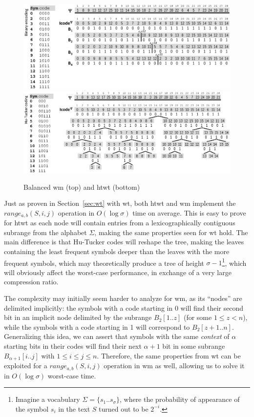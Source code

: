 \documentclass[a4paper,10pt,twoside]{book}
\begin{document}
	\begin{figure}[htb]
    	\begin{center}
    		{\includegraphics[width=1.0\textwidth]{figures/wma.eps}}
    		{\includegraphics[width=1.0\textwidth]{figures/wta.eps}}
    	\end{center}
    	\caption{Balanced \acrlong{wm} (top) and \acrlong{htwt} (bottom)}
    	\label{fig:wtwm}
    \end{figure}

	
	Just as proven in Section~\ref{sec:wt} with \gls{wt}, both \gls{htwt} and \gls{wm} implement the $range_{a,b}(S,i,j)$ operation in $O(\log\sigma)$ time on average. This is easy to prove for \gls{htwt} as each node will contain entries from a lexicographically contiguous subrange from the alphabet $\Sigma$, making the same properties seen for \gls{wt} hold. The main difference is that Hu-Tucker codes will reshape the tree, making the leaves containing the least frequent symbols deeper than the leaves with the more frequent symbols, which may theoretically produce a tree of height $\sigma-1$\footnote{Imagine a vocabulary $\Sigma=\{s_1..s_\sigma\}$, where the probability of appearance of the symbol $s_i$ in the text $S$ turned out to be $2^{-i}$.}, which will obviously affect the worst-case performance, in exchange of a very large compression ratio.
	
	The complexity may initially seem harder to analyze for \gls{wm}, as its ``nodes'' are delimited implicitly: the symbols with a code starting in 0 will find their second bit in an implicit node delimited by the subrange $B_2[1..z]$ (for some $1 \leq z < n$), while the symbols with a code starting in 1 will correspond to $B_2[z+1..n]$. Generalizing this idea, we can assert that symbols with the same \textit{context} of $\alpha$ starting bits in their codes will find their next $\alpha+1$ bit in some subrange $B_{\alpha+1}[i..j]$ with $1 \leq i \leq j \leq n$. Therefore, the same properties from \gls{wt} can be exploited for a $range_{a,b}(S,i,j)$ operation in \gls{wm} as well, allowing us to solve it in $O(\log\sigma)$ worst-case time.
	
\end{document}
